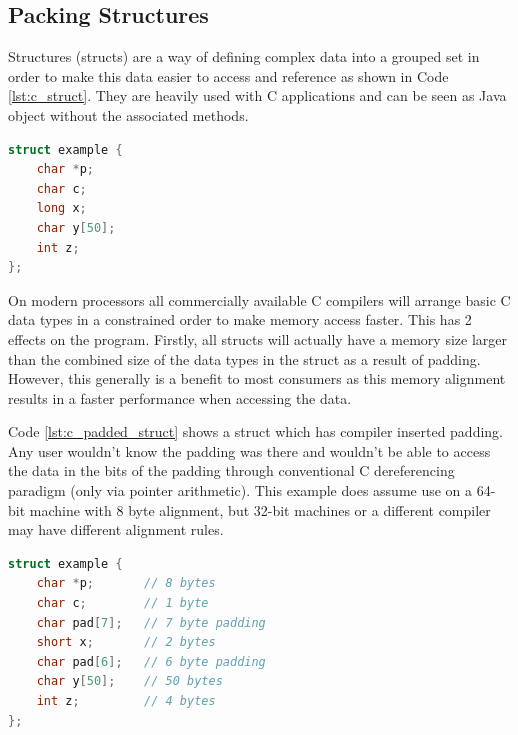 \documentclass[final_report.tex]{subfiles}
\begin{document}
\subsection{Packing Structures}
Structures (structs) are a way of defining complex data into a grouped set in order to make this data easier to access and reference as shown in Code \ref{lst:c_struct}. They are heavily used with C applications and can be seen as Java object without the associated methods.

\begin{lstlisting}[language=C, caption={Example C Struct}, label=lst:c_struct]
struct example {
    char *p;
    char c;
    long x;
    char y[50];
    int z;
};
\end{lstlisting}

On modern processors all commercially available C compilers will arrange basic C data types in a constrained order to make memory access faster. This has 2 effects on the program. Firstly, all structs will actually have a memory size larger than the combined size of the data types in the struct as a result of padding. However, this generally is a benefit to most consumers as this memory alignment results in a faster performance when accessing the data.


Code \ref{lst:c_padded_struct} shows a struct which has compiler inserted padding. Any user wouldn't know the padding was there and wouldn't be able to access the data in the bits of the padding through conventional C dereferencing paradigm (only via pointer arithmetic). This example does assume use on a 64-bit machine with 8 byte alignment, but 32-bit machines or a different compiler may have different alignment rules.

\begin{lstlisting}[language=C, caption={Example C Struct with compiler inserted padding}, label=lst:c_padded_struct]
struct example {
    char *p;       // 8 bytes
    char c;        // 1 byte
    char pad[7];   // 7 byte padding
    short x;       // 2 bytes
    char pad[6];   // 6 byte padding
    char y[50];    // 50 bytes
    int z;         // 4 bytes
};
\end{lstlisting}
\end{document}
